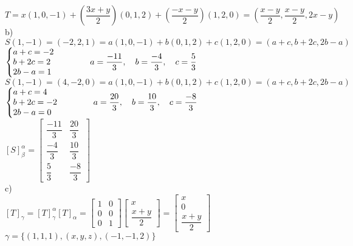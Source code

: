 \documentclass[12pt]{article}
\begin{document}
$T=x(1,0,-1)+(\dfrac{3x+y}{2})(0,1,2)+(\dfrac{-x-y}{2})(1,2,0)=(\dfrac{x-y}{2},\dfrac{x-y}{2},2x-y)$\\

\noindent b)\\

$S(1,-1)=(-2,2,1)=a(1,0,-1)+b(0,1,2)+c(1,2,0)=(a+c,b+2c,2b-a)$\\

$\left\{\begin{array}{@{}l@{}}a+c=-2\\b+2c=2\\2b-a=1\end{array}\right.\qquad\qquad a=\dfrac{-11}{3},\quad b=\dfrac{-4}{3},\quad c=\dfrac{5}{3}$\\
	
$S(1,-1)=(4,-2,0)=a(1,0,-1)+b(0,1,2)+c(1,2,0)=(a+c,b+2c,2b-a)$\\

$\left\{\begin{array}{@{}l@{}}a+c=4\\b+2c=-2\\2b-a=0\end{array}\right.\qquad\qquad a=\dfrac{20}{3},\quad b=\dfrac{10}{3},\quad c=\dfrac{-8}{3}$\\

$[S]^{\alpha}_{\beta}=\begin{bmatrix}\dfrac{-11}{3}&\dfrac{20}{3}\\\dfrac{-4}{3}&\dfrac{10}{3}\\\dfrac{5}{3}&\dfrac{-8}{3}\end{bmatrix}$\\
	
\noindent c)\\

$[T]_{\gamma}=[T]_{\gamma}^{\alpha}[T]_{\alpha}=\begin{bmatrix}1&0\\0&0\\0&1\end{bmatrix}\begin{bmatrix}x\\\dfrac{x+y}{2}\end{bmatrix}=\begin{bmatrix}x\\0\\\dfrac{x+y}{2}\end{bmatrix}$\\

$\gamma=\lbrace(1,1,1),(x,y,z),(-1,-1,2)\rbrace$\\
\end{document}
